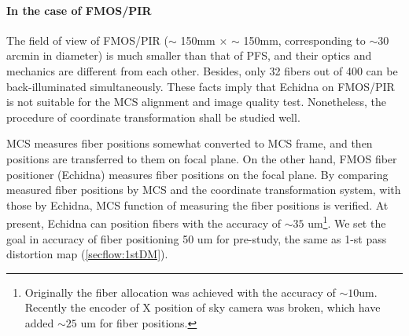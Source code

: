 \paragraph{In the case of FMOS/PIR}
The field of view of FMOS/PIR ($\sim$ 150mm $\times$ $\sim$ 150mm, corresponding to $\sim 30$ arcmin in diameter) is much smaller than that of PFS, and their optics and mechanics are different from each other.
Besides, only 32 fibers out of 400 can be back-illuminated simultaneously.
These facts imply that Echidna on FMOS/PIR is not suitable for the MCS alignment and image quality test.
Nonetheless, the procedure of coordinate transformation shall be studied well.

MCS measures fiber positions somewhat converted to MCS frame, and then positions are transferred to them on focal plane.
On the other hand, FMOS fiber positioner (Echidna) measures fiber positions on the focal plane.
By comparing measured fiber positions by MCS and the coordinate transformation system, with those by Echidna, MCS function of measuring the fiber positions is verified.
At present, Echidna can position fibers with the accuracy of $\sim 35$ um\footnote{Originally the fiber allocation was achieved with the accuracy of $\sim 10$um. Recently the encoder of X position of sky camera was broken, which have added $\sim 25$ um for fiber positions.}.
We set the goal in accuracy of fiber positioning 50 um for pre-study, the same as 1-st pass distortion map (\ref{secflow:1stDM}).

